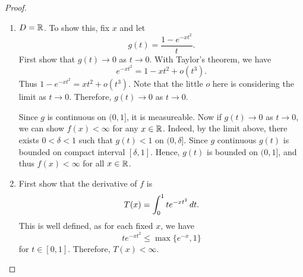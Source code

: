 \documentclass[a4paper]{article}
\begin{document}
\begin{proof}
  \begin{enumerate}
    \item $D = \mathbb{R}$. To show this, fix $x$ and let
          \[
            g(t) = \frac{1 - e^{-x t^2}}{t}.
          \]
          First show that $g(t) \to 0$ as $t \to 0$. With Taylor's
          theorem, we have
          \[
            e^{-x t^2} = 1 - x t^2 + o(t^3).
          \]
          Thus $1 - e^{-x t^2} = x t^2 + o(t^3)$. Note that the little $o$
          here is considering the limit as $t \to 0$. Therefore, $g(t) \to
          0$ as $t \to 0$.

          Since $g$ is continuous on $(0, 1]$, it is measureable. Now if
          $g(t) \to 0$ as $t \to 0$, we can show $f(x) < \infty$ for any
          $x \in \mathbb{R}$. Indeed, by the limit above, there exists $0 < \delta
          < 1$ such that $g(t) < 1$ on $(0, \delta]$. Since $g$ continuous
          $g(t)$ is bounded on compact interval $[\delta, 1]$. Hence,
          $g(t)$ is bounded on $(0, 1]$, and thus $f(x) < \infty$ for all
          $x \in \mathbb{R}$.

    \item First show that the derivative of $f$ is
          \[
            T(x) = \int_0^1 t e^{-x t^2} \, d t.
          \]
          This is well defined, as for each fixed $x$, we have
          \[
            t e^{-x t^2} \leq \max \{e^{-x}, 1\}
          \]
          for $t \in [0, 1]$. Therefore, $T(x) < \infty$.


\end{enumerate}
\end{proof}
\end{document}
